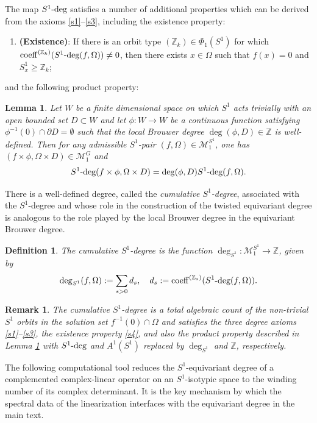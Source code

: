 \documentclass[twoside,11pt]{article}
\def\bz{{\mathbb{Z}}}
\def\s1deg{S^1\text{\rm -deg}}
\def\Om{\Omega}
\newtheorem{lemma}[theorem]{Lemma}
\newtheorem{definition}[theorem]{Definition}
\newtheorem{remark}[theorem]{Remark}
\begin{document}
The map $\s1deg$ satisfies a number of additional properties which can be derived from the axioms \ref{s1}--\ref{s3}, including the existence property:
\begin{enumerate}[label=($S_\arabic*$), resume]
    \item\label{s4} \textbf{(Existence)}: If there is an orbit type $(\bz_k) \in \Phi_1(S^1)$ for which $\operatorname{coeff}^{(\bz_k)}(\s1deg(f,\Om)) \neq 0$, then there exists $x \in \Om$ such that $f(x) = 0$ and $S^1_x \ge \bz_k$;
\end{enumerate}
and the following product property:
\begin{lemma} \rm \label{lemm:s1_degree_product_property}
Let $W$ be a finite dimensional space on which $S^1$ acts trivially with an open bounded set $D \subset W$ and let $\phi: W \to W$ be a continuous function satisfying $\phi^{-1}(0) \cap \partial D = \emptyset$ such that the local Brouwer degree $\deg(\phi,D) \in \bz$ is well-defined. Then for any admissible $S^1$-pair $(f,\Om) \in \mathcal M^{S^1}_1$, one has $(f \times \phi, \Om \times D) \in \mathcal M^{G}_1$ and
\[
\s1deg(f \times \phi, \Om \times D) = \deg(\phi,D) \s1deg(f,\Om).
\]
\end{lemma}
There is a well-defined degree, called the {\it cumulative $S^1$-degree}, associated with the $S^1$-degree and whose role in the construction of the twisted equivariant degree is analogous to the role played by the local Brouwer degree in the equivariant Brouwer degree.
\begin{definition} \rm
The cumulative $S^1$-degree is the function $\deg_{S^1}:\mathscr M_1^{S^1} \rightarrow \bz$, given by
\[
\deg_{S^1}(f,\Om) := \sum_{s > 0} d_s, \quad d_s := \operatorname{coeff}^{(\bz_s)}(\s1deg(f,\Om)).
\]
\end{definition}
\begin{remark} \rm
    The cumulative $S^1$-degree is a total algebraic count of the non-trivial $S^1$ orbits in the solution set $f^{-1}(0) \cap \Om$ and satisfies the three degree axioms \ref{s1}--\ref{s3}, the existence property \ref{s4}, and also the product property described in Lemma \ref{lemm:s1_degree_product_property} with $\s1deg$ and $A^1(S^1)$ replaced by $\deg_{S^1}$ and $\bz$, respectively.
\end{remark}
The following computational tool reduces the $S^1$-equivariant degree of a complemented complex-linear operator on an $S^1$-isotypic space to the winding number of its complex determinant. It is the key mechanism by which the spectral data of the linearization interfaces with the equivariant degree in the main text.
\end{document}
